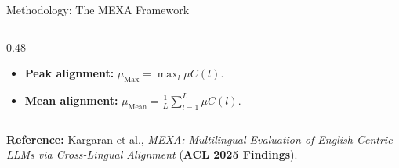\documentclass[
  english,
  aspectratio=169,
]{tumbeamer}
\begin{document}
\begin{frame}{Methodology: The MEXA Framework}
\begin{columns}[T]
\begin{column}{0.48\textwidth}
{\begin{itemize}
          \item \textbf{Peak alignment:} $\mu_{\text{Max}} = \max_l \mu C(l)$.
          \item \textbf{Mean alignment:} $\mu_{\text{Mean}} = \frac{1}{L} \sum_{l=1}^L \mu C(l)$.
        \end{itemize}
      }
    \end{column}
  \end{columns}
  \vspace{0.2em}
  \begin{takeawaybox}
    \textbf{Reference:} Kargaran et al., \textit{MEXA: Multilingual Evaluation of English-Centric LLMs via Cross-Lingual Alignment} (\textbf{ACL 2025 Findings}).
  \end{takeawaybox}
\end{frame}
\end{document}
